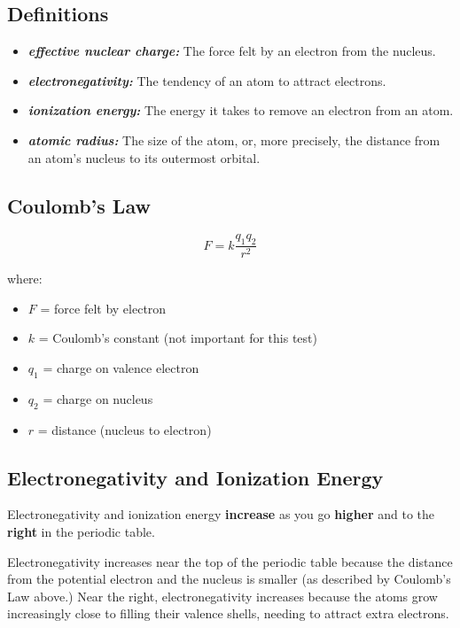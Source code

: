 \documentclass[a4paper, 12pt]{article}
\begin{document}
\subsection*{Definitions}
\begin{itemize}[leftmargin=*, nosep]
    \item \textbf{\textit{effective nuclear charge:}} The force felt by an electron from the nucleus.
    \item \textbf{\textit{electronegativity:}} The tendency of an atom to attract electrons.
    \item \textbf{\textit{ionization energy:}} The energy it takes to remove an electron from an atom.
    \item \textbf{\textit{atomic radius:}} The size of the atom, or, more precisely, the distance from an atom's nucleus to its outermost orbital.
\end{itemize}

\subsection*{Coulomb's Law}

$$F = k\frac{q_1q_2}{r^2}$$

where:
\begin{itemize}[nosep]
    \item $F$ = force felt by electron
    \item $k$ = Coulomb's constant (not important for this test)
    \item $q_1$ = charge on valence electron
    \item $q_2$ = charge on nucleus
    \item $r$ = distance (nucleus to electron)
\end{itemize}

\subsection*{Electronegativity and Ionization Energy}
Electronegativity and ionization energy \textbf{increase} as you go \textbf{higher} and to the \textbf{right} in the periodic table.
 
Electronegativity increases near the top of the periodic table because the distance from the potential electron and the nucleus is smaller (as described by Coulomb's Law above.) Near the right, electronegativity increases because the atoms grow increasingly close to filling their valence shells, needing to attract extra electrons.
 
\end{document}
